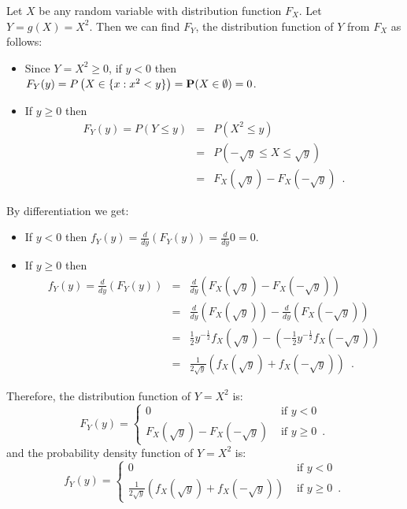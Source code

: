 \begin{example}\label{Exm:DirectMethodforYisXSquared}
Let $X$ be any random variable with distribution function $F_X$.  Let $Y=g(X)=X^2$.  
Then we can find $F_Y$, the distribution function of $Y$ from $F_X$ as follows:
\begin{itemize}
\item {Since $Y=X^2 \geq 0$, if $y < 0$ then $F_Y(y) = P\left( X \in \{ x : x^2 < y\} \right) = \mathbf{P}(X \in \emptyset) = 0$.}
\item {If $y \geq 0$ then
\begin{eqnarray*}
F_Y(y) = P \left(Y \leq y \right) 
&=& P \left( X^2 \leq y \right) \\
&=& P \left( -\sqrt{y} \leq X \leq \sqrt{y} \right) \\
&=& F_X(\sqrt{y}) - F_X(-\sqrt{y}) \enspace .
\end{eqnarray*}
}
\end{itemize}
By differentiation we get:
\begin{itemize}
\item {If $y<0$ then $f_Y(y)=\frac{d}{dy}(F_Y(y)) = \frac{d}{dy} 0 = 0$.}
\item {If $y \geq 0$ then
\begin{eqnarray*}
f_Y(y) 
= \frac{d}{dy}\left( F_Y(y) \right) 
&=& \frac{d}{dy}\left( F_X(\sqrt{y}) - F_X( - \sqrt{y}) \right)\\
&=& \frac{d}{dy}\left( F_X(\sqrt{y}) \right) - \frac{d}{dy}\left( F_X( - \sqrt{y}) \right)\\
&=& \frac{1}{2}y^{-\frac{1}{2}} f_X(\sqrt{y}) - \left( -\frac{1}{2}y^{-\frac{1}{2}} f_X( - \sqrt{y}) \right)\\
&=& \frac{1}{2 \sqrt{y}} \left( f_X(\sqrt{y}) + f_X( - \sqrt{y}) \right) \enspace .
\end{eqnarray*}
}
\end{itemize}
Therefore, the distribution function of $Y=X^2$ is:
\begin{equation}\label{E:F_YofX^2}
F_Y(y) = 
\begin{cases}
0 & \text{ if } y < 0 \\
F_X(\sqrt{y}) - F_X(-\sqrt{y}) & \text{ if } y \geq 0 \enspace .
\end{cases}
\end{equation}
and the probability density function of $Y=X^2$ is:
\begin{equation}\label{E:f_YofX^2}
f_Y(y) = 
\begin{cases}
0 & \text{ if } y < 0 \\
\frac{1}{2 \sqrt{y}} \left( f_X(\sqrt{y}) + f_X( - \sqrt{y}) \right) & \text{ if } y \geq 0 \enspace .
\end{cases}
\end{equation}
\end{example} 

